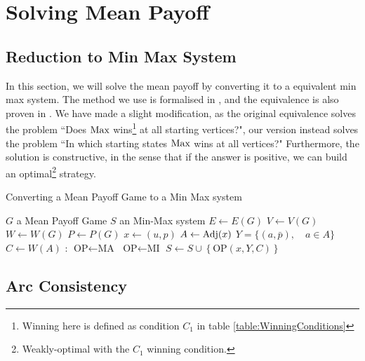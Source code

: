 \section{Solving Mean Payoff}
\subsection{Reduction to Min Max System}
In this section, we will solve the mean payoff by converting it to a equivalent min max system.
\newline The method we use is formalised in \cite{MPGMaxAtom}, and the equivalence is also proven in \cite{MPGMaxAtom}.
\newline We have made a slight modification, as the original equivalence solves the problem ``Does $\operatorname{Max}$ wins\footnote{Winning here is defined as condition $C_1$ in table \ref{table:WinningConditions}} at all starting vertices?", our version instead solves the problem ``In which starting states $\operatorname{Max}$ wins at all vertices?" 
\newline Furthermore, the solution is constructive, in the sense that if the answer is positive, we can build an optimal\footnote{Weakly-optimal with the $C_1$ winning condition.} strategy.
\begin{algorithm}
	\caption{Converting a Mean Payoff Game to a Min Max system}\label{alg:MPGToMinMax}
	\begin{algorithmic}
		\Require $G$ a Mean Payoff Game
		\Ensure $S$ an Min-Max system 
		\State $E\leftarrow E(G)$ 
		\State $V\leftarrow V(G)$
		\State $W \leftarrow W(G)$ 
		\State $P \leftarrow P(G)$ 
			\State $x\leftarrow (u,p)$
			\State $A\leftarrow \operatorname{Adj}(x)$
			\State $Y=\{(a,\bar{p}),\quad a\in A\}$
			\State $C\leftarrow W(A)$ 
			:
				\State $\text{OP}\leftarrow \text{MA}$			
			\Else
				\State $\text{OP}\leftarrow \text{MI}$	
			\EndIf
			\State $S\leftarrow S\cup \left\{\text{OP}(x,Y,C)\right\}$
		\EndFor
	\end{algorithmic}
\end{algorithm}
\subsection{Arc Consistency}
